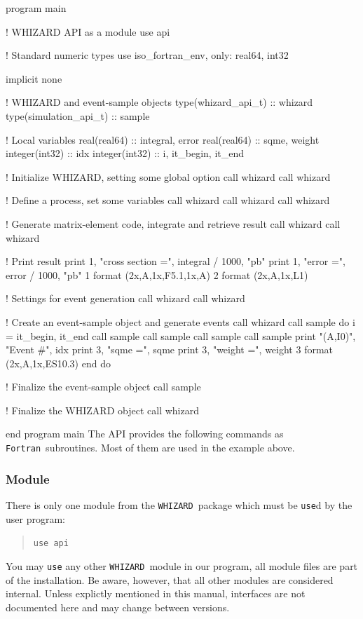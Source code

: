 \documentclass[12pt]{book}
\newenvironment{code}%
  {\begingroup\footnotesize
   \quote
   \Verbatim}%
  {\endVerbatim
   \endquote
   \endgroup\noindent}
\newcommand{\ttt}[1]{\texttt{#1}}
\newcommand{\whizard}{\ttt{WHIZARD}}
\newcommand{\fortran}{\ttt{Fortran}}
\begin{document}
\begin{code}
program main

  ! WHIZARD API as a module
  use api

  ! Standard numeric types
  use iso_fortran_env, only: real64, int32

  implicit none

  ! WHIZARD and event-sample objects
  type(whizard_api_t)    :: whizard
  type(simulation_api_t) :: sample

  ! Local variables
  real(real64)   :: integral, error
  real(real64)   :: sqme, weight
  integer(int32) :: idx
  integer(int32) :: i, it_begin, it_end

  ! Initialize WHIZARD, setting some global option
  call whizard%
  call whizard%

  ! Define a process, set some variables
  call whizard%
  call whizard%
  call whizard%

  ! Generate matrix-element code, integrate and retrieve result
  call whizard%
  call whizard%

  ! Print result
  print 1, "cross section =", integral / 1000, "pb"
  print 1, "error         =", error    / 1000, "pb"
1 format (2x,A,1x,F5.1,1x,A)
2 format (2x,A,1x,L1)

  ! Settings for event generation
  call whizard%
  call whizard%

  ! Create an event-sample object and generate events
  call whizard%
  call sample%
  do i = it_begin, it_end
     call sample%
     call sample%
     call sample%
     call sample%
     print "(A,I0)", "Event #", idx
     print 3, "sqme    =", sqme
     print 3, "weight  =", weight
3    format (2x,A,1x,ES10.3)
  end do

  ! Finalize the event-sample object
  call sample%

  ! Finalize the WHIZARD object
  call whizard%

end program main
\end{code}
The API provides the following commands as \fortran\ subroutines.  Most of them
are used in the example above.

\subsubsection{Module}
There is only one module from the \whizard\ package which must be
\texttt{use}d by the user program:
\begin{quote}
  \tt use api
\end{quote}
You may \texttt{use} any other \whizard\ module in our program, all module
files are part of the installation.  Be aware,
however, that all other modules are considered internal.  Unless explictly
mentioned in this manual, interfaces are
not documented here and may change between versions.
\end{document}
